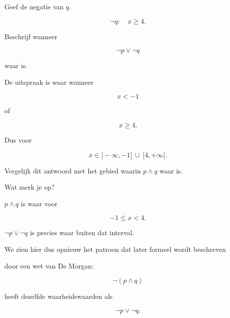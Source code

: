 \documentclass{ximera}
\begin{document}
\begin{oefening}{\oefU \ESS}
\begin{question}
\end{question}



\begin{question}

Geef de negatie van $q$.

\begin{oplossing}

\[
\neg q:\quad x\geq4.
\]

\end{oplossing}

\end{question}



\begin{question}

Beschrijf wanneer

\[
\neg p\lor\neg q
\]

waar is.

\begin{oplossing}

De uitspraak is waar wanneer

\[
x<-1
\]

of

\[
x\geq4.
\]

Dus voor

\[
x\in]-\infty,-1[\ \cup\ [4,+\infty[.
\]

\end{oplossing}

\end{question}



\begin{question}

Vergelijk dit antwoord met het gebied waarin $p\land q$ waar is.

Wat merk je op?

\begin{oplossing}

$p\land q$ is waar voor

\[
-1\leq x<4.
\]

$\neg p\lor\neg q$ is precies waar buiten dat interval.

We zien hier dus opnieuw het patroon dat later formeel wordt beschreven

door een wet van De Morgan:

\[
\neg(p\land q)
\]

heeft dezelfde waarheidswaarden als

\[
\neg p\lor\neg q.
\]

\end{oplossing}

\end{question}

\end{oefening}
\end{document}
